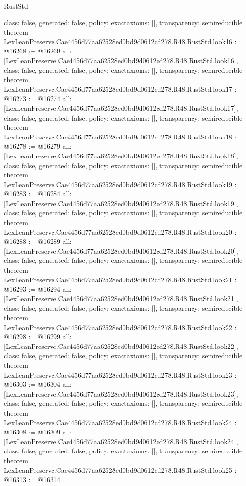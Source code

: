 \begin{lexlean}{RustStd}
\begin{coremodule}
{  class: false,
  generated: false,
  policy: exact{axioms: []},
  transparency: semireducible
}
theorem LexLeanPreserve.Cae4456d77aa62528ed0bd9d0612cd278.R48.RustStd.look16 : @16268 := @16269 {
  all: [LexLeanPreserve.Cae4456d77aa62528ed0bd9d0612cd278.R48.RustStd.look16],
  class: false,
  generated: false,
  policy: exact{axioms: []},
  transparency: semireducible
}
theorem LexLeanPreserve.Cae4456d77aa62528ed0bd9d0612cd278.R48.RustStd.look17 : @16273 := @16274 {
  all: [LexLeanPreserve.Cae4456d77aa62528ed0bd9d0612cd278.R48.RustStd.look17],
  class: false,
  generated: false,
  policy: exact{axioms: []},
  transparency: semireducible
}
theorem LexLeanPreserve.Cae4456d77aa62528ed0bd9d0612cd278.R48.RustStd.look18 : @16278 := @16279 {
  all: [LexLeanPreserve.Cae4456d77aa62528ed0bd9d0612cd278.R48.RustStd.look18],
  class: false,
  generated: false,
  policy: exact{axioms: []},
  transparency: semireducible
}
theorem LexLeanPreserve.Cae4456d77aa62528ed0bd9d0612cd278.R48.RustStd.look19 : @16283 := @16284 {
  all: [LexLeanPreserve.Cae4456d77aa62528ed0bd9d0612cd278.R48.RustStd.look19],
  class: false,
  generated: false,
  policy: exact{axioms: []},
  transparency: semireducible
}
theorem LexLeanPreserve.Cae4456d77aa62528ed0bd9d0612cd278.R48.RustStd.look20 : @16288 := @16289 {
  all: [LexLeanPreserve.Cae4456d77aa62528ed0bd9d0612cd278.R48.RustStd.look20],
  class: false,
  generated: false,
  policy: exact{axioms: []},
  transparency: semireducible
}
theorem LexLeanPreserve.Cae4456d77aa62528ed0bd9d0612cd278.R48.RustStd.look21 : @16293 := @16294 {
  all: [LexLeanPreserve.Cae4456d77aa62528ed0bd9d0612cd278.R48.RustStd.look21],
  class: false,
  generated: false,
  policy: exact{axioms: []},
  transparency: semireducible
}
theorem LexLeanPreserve.Cae4456d77aa62528ed0bd9d0612cd278.R48.RustStd.look22 : @16298 := @16299 {
  all: [LexLeanPreserve.Cae4456d77aa62528ed0bd9d0612cd278.R48.RustStd.look22],
  class: false,
  generated: false,
  policy: exact{axioms: []},
  transparency: semireducible
}
theorem LexLeanPreserve.Cae4456d77aa62528ed0bd9d0612cd278.R48.RustStd.look23 : @16303 := @16304 {
  all: [LexLeanPreserve.Cae4456d77aa62528ed0bd9d0612cd278.R48.RustStd.look23],
  class: false,
  generated: false,
  policy: exact{axioms: []},
  transparency: semireducible
}
theorem LexLeanPreserve.Cae4456d77aa62528ed0bd9d0612cd278.R48.RustStd.look24 : @16308 := @16309 {
  all: [LexLeanPreserve.Cae4456d77aa62528ed0bd9d0612cd278.R48.RustStd.look24],
  class: false,
  generated: false,
  policy: exact{axioms: []},
  transparency: semireducible
}
theorem LexLeanPreserve.Cae4456d77aa62528ed0bd9d0612cd278.R48.RustStd.look25 : @16313 := @16314 {
}
\end{coremodule}
\end{lexlean}
